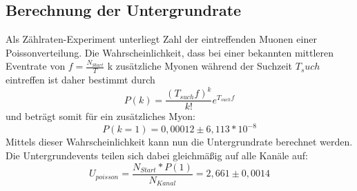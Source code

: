 \subsection{Berechnung der Untergrundrate}
Als Zählraten-Experiment unterliegt Zahl der eintreffenden Muonen einer Poissonverteilung. Die Wahrscheinlichkeit, dass bei einer bekannten mittleren Eventrate von $f=\frac{N_{Start}}{T}$ k zusätzliche Myonen während der Suchzeit $T_such$ eintreffen ist daher bestimmt durch
\begin{equation}
P(k)=\frac{(T_{such}f)^k}{k!}e^{T_{such}f}
\end{equation}
und beträgt somit für ein zusätzliches Myon:
\begin{equation}
P(k=1)=0,00012\pm6,113*10^{-8}
\end{equation}
Mittels dieser Wahrscheinlichkeit kann nun die Untergrundrate berechnet werden. Die Untergrundevents teilen sich dabei gleichmäßig auf alle Kanäle auf:
\begin{equation}
U_{poisson}=\frac{N_{Start}*P(1)}{N_{Kanal}}=2,661\pm0,0014
\end{equation}
